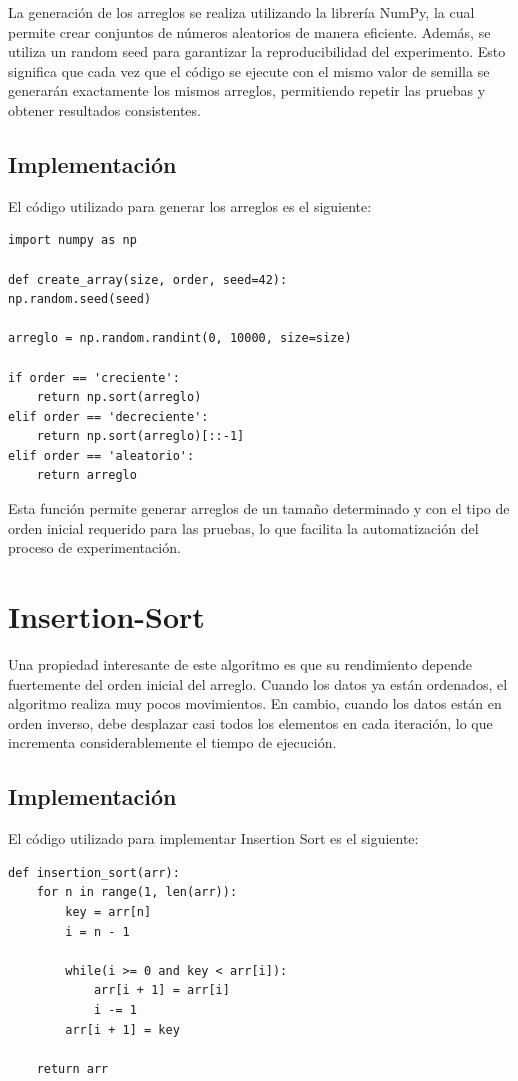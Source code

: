 \documentclass[a4paper, 11pt]{article}
\begin{document}
La generación de los arreglos se realiza utilizando la librería NumPy, la cual permite crear conjuntos de números aleatorios de manera eficiente. Además, se utiliza un random seed para garantizar la reproducibilidad del experimento. Esto significa que cada vez que el código se ejecute con el mismo valor de semilla se generarán exactamente los mismos arreglos, permitiendo repetir las pruebas y obtener resultados consistentes.

\newpage
\subsection{Implementación}
El código utilizado para generar los arreglos es el siguiente:
\begin{lstlisting}
import numpy as np

def create_array(size, order, seed=42):
np.random.seed(seed)

arreglo = np.random.randint(0, 10000, size=size)
    
if order == 'creciente':
    return np.sort(arreglo)
elif order == 'decreciente':
    return np.sort(arreglo)[::-1]
elif order == 'aleatorio':
    return arreglo
\end{lstlisting}
Esta función permite generar arreglos de un tamaño determinado y con el tipo de orden inicial requerido para las pruebas, lo que facilita la automatización del proceso de experimentación.



\section{Insertion-Sort}
Una propiedad interesante de este algoritmo es que su rendimiento depende fuertemente del orden inicial del arreglo. Cuando los datos ya están ordenados, el algoritmo realiza muy pocos movimientos. En cambio, cuando los datos están en orden inverso, debe desplazar casi todos los elementos en cada iteración, lo que incrementa considerablemente el tiempo de ejecución.

\subsection{Implementación}
El código utilizado para implementar Insertion Sort es el siguiente:
\begin{lstlisting}
def insertion_sort(arr):
    for n in range(1, len(arr)):
        key = arr[n]
        i = n - 1

        while(i >= 0 and key < arr[i]):
            arr[i + 1] = arr[i]
            i -= 1
        arr[i + 1] = key

    return arr
\end{lstlisting}
\end{document}
